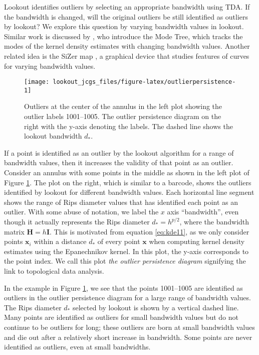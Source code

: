 \documentclass[12pt]{article}
\theoremstyle{definition}
\theoremstyle{definition}
\theoremstyle{definition}
\theoremstyle{remark}
\begin{document}
Lookout identifies outliers by selecting an appropriate bandwidth using TDA. If the bandwidth is changed, will the original outliers be still identified as outliers by lookout? We explore this question by varying bandwidth values in lookout. Similar work is discussed by \citet{Minnotte1993}, who introduce the Mode Tree, which tracks the modes of the kernel density estimates with changing bandwidth values. Another related idea is the SiZer map \citep{Chaudhuri1999}, a graphical device that studies features of curves for varying bandwidth values.

\begin{figure}
\texttt{[image: lookout\_jcgs\_files/figure-latex/outlierpersistence-1]} \caption{Outliers at the center of the annulus in the left plot showing the outlier labels 1001--1005. The outlier persistence diagram on the right with the y-axis denoting the labels. The dashed line shows the lookout bandwidth $d_*$.}\label{fig:outlierpersistence}
\end{figure}

If a point is identified as an outlier by the lookout algorithm for a range of bandwidth values, then it increases the validity of that point as an outlier. Consider an annulus with some points in the middle as shown in the left plot of Figure \ref{fig:outlierpersistence}. The plot on the right, which is similar to a barcode, shows the outliers identified by lookout for different bandwidth values. Each horizontal line segment shows the range of Rips diameter values that has identified each point as an outlier. With some abuse of notation, we label the \(x\) axis ``bandwidth'', even though it actually represents the Rips diameter \(d_* = h^{p/2}\), where the bandwidth matrix \(\bm{H} = h\bm{I}\). This is motivated from equation \eqref{eq:kde11}, as we only consider points \(\bm{x}_i\) within a distance \(d_*\) of every point \(\bm{x}\) when computing kernel density estimates using the Epanechnikov kernel. In this plot, the y-axis corresponds to the point index. We call this plot \emph{the outlier persistence diagram} signifying the link to topological data analysis.

In the example in Figure \ref{fig:outlierpersistence}, we see that the points 1001--1005 are identified as outliers in the outlier persistence diagram for a large range of bandwidth values. The Rips diameter \(d_*\) selected by lookout is shown by a vertical dashed line. Many points are identified as outliers for small bandwidth values but do not continue to be outliers for long; these outliers are born at small bandwidth values and die out after a relatively short increase in bandwidth. Some points are never identified as outliers, even at small bandwidths.
\end{document}
